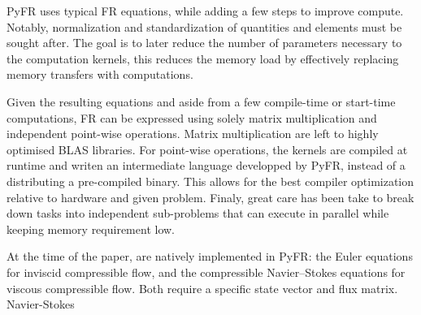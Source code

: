 \documentclass[12pt]{article}
\begin{document}
PyFR uses typical FR equations, while adding a few steps to improve compute. Notably, normalization and standardization of quantities and elements must be sought after. The goal is to later reduce the number of parameters necessary to the computation kernels, this reduces the memory load by effectively replacing memory transfers with computations. 

Given the resulting equations and aside from a few compile-time or start-time computations, FR can be expressed using solely matrix multiplication and independent point-wise operations. Matrix multiplication are left to highly optimised BLAS libraries. For point-wise operations, the kernels are compiled at runtime and writen an intermediate language developped by PyFR, instead of a distributing a pre-compiled binary. This allows for the best compiler optimization relative to hardware and given problem. Finaly, great care has been take to break down tasks into independent sub-problems that can execute in parallel while keeping memory requirement low.

At the time of the paper, are natively implemented in PyFR: the Euler equations for inviscid compressible flow, and the compressible Navier–Stokes equations for viscous compressible flow. Both require a specific state vector and flux matrix. Navier-Stokes
\end{document}
